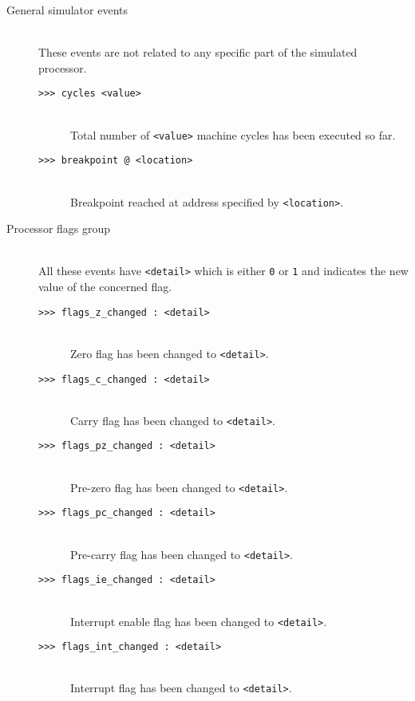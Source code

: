         \begin{description}
            \item[General simulator events]~\\
                These events are not related to any specific part of the simulated processor.
                \begin{description}
                    \item[\texttt{>{}>{}> cycles <value>}]~\\
                        Total number of \texttt{<value>} machine cycles has been executed so far.
                    \item[\texttt{>{}>{}> breakpoint @ <location>}]~\\
                        Breakpoint reached at address specified by \texttt{<location>}.
                \end{description}

            \item[Processor flags group]~\\
                All these events have \texttt{<detail>} which is either \texttt{0} or \texttt{1} and indicates the new value of the concerned flag.
                \begin{description}
                    \item[\texttt{>{}>{}> flags\_z\_changed : <detail>}]~\\
                        Zero flag has been changed to \texttt{<detail>}.
                    \item[\texttt{>{}>{}> flags\_c\_changed : <detail>}]~\\
                        Carry flag has been changed to \texttt{<detail>}.
                    \item[\texttt{>{}>{}> flags\_pz\_changed : <detail>}]~\\
                        Pre-zero flag has been changed to \texttt{<detail>}.
                    \item[\texttt{>{}>{}> flags\_pc\_changed : <detail>}]~\\
                        Pre-carry flag has been changed to \texttt{<detail>}.
                    \item[\texttt{>{}>{}> flags\_ie\_changed : <detail>}]~\\
                        Interrupt enable flag has been changed to \texttt{<detail>}.
                    \item[\texttt{>{}>{}> flags\_int\_changed : <detail>}]~\\
                        Interrupt flag has been changed to \texttt{<detail>}.
                \end{description}


\end{description}
